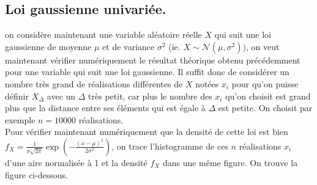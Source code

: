 \documentclass[a4paper]{article}
\begin{document}
\subsection{Loi gaussienne univariée.}
on considère maintenant une variable aléatoire réelle $X$ qui suit une loi gaussienne de moyenne $\mu$ et de variance $\sigma^{2}$ (ie. $X \sim \mathcal{N}(\mu, \sigma^{2}))$, on veut maintenant vérifier numériquement le résultat théorique obtenu précédemment pour une variable qui suit une loi gaussienne. Il suffit donc de considérer un nombre très grand de réalisations différentes de $X$ notées $x_i$ pour qu'on puisse définir $X_{\Delta}$ avec un $\Delta$ très petit, car plus le nombre des $x_i$ qu'on choisit est grand plus que la distance entre ses éléments qui est égale à $\Delta$ est petite. On choisit par exemple $n=10000$ réalisations.\\
Pour vérifier maintenant numériquement que la densité de cette loi est bien $f_{X}=\frac{1}{\sigma\sqrt{2\pi}}\exp\left(-\frac{(x-\mu)^{2}}{2\sigma^2}\right)$, on trace l'histogramme de ces $n$ réalisations $x_{i}$ d'une aire normalisée à 1 et la densité $f_{X}$ dans une même figure. On trouve la figure ci-dessous.
\end{document}
